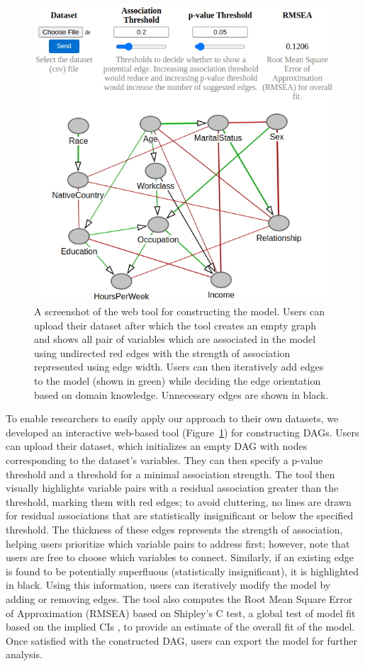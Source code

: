 \documentclass[accepted]{uai2025} %
\begin{document}
\begin{figure}[t!]
	\centering
	\includegraphics[scale=0.4]{../code/plots/web_tool_full_new.png}
	\caption{A screenshot of the web tool for constructing the model. Users
		can upload their dataset after which the tool creates an empty
		graph and shows all pair of variables which are associated in
		the model using undirected red edges with the strength of
		association represented using edge width. Users can then
		iteratively add edges to the model (shown in green) while
		deciding the edge orientation based on domain knowledge.
		Unnecessary edges are shown in black.}
	\label{fig:web}
\end{figure}

To enable researchers to easily apply our approach to their own datasets, we
developed an interactive web-based tool (Figure~\ref{fig:web}) for constructing
DAGs. Users can upload their dataset, which initializes an empty DAG with nodes
corresponding to the dataset's variables. They can then specify a p-value
threshold and a threshold for a minimal association strength. The tool 
then visually highlights variable pairs
with a residual association greater than the threshold, marking them with red
edges; to avoid cluttering, no lines are drawn for residual associations that
are statistically insignificant or below the specified threshold.
The thickness of these edges represents the strength of association,
helping users prioritize which variable pairs to address first; however, note that
users are free to choose which variables to connect. Similarly, if
an existing edge is found to be potentially superfluous (statistically insignificant),
it is highlighted in black. Using this information, users can iteratively
modify the model by adding or removing edges. The tool also computes the Root
Mean Square Error of Approximation (RMSEA) based on Shipley's C test, a global test 
of model fit based on the implied CIs \citep{Shipley2000}, to provide an estimate of the
overall fit of the model. Once satisfied with the constructed DAG, users can
export the model for further analysis.
\end{document}

